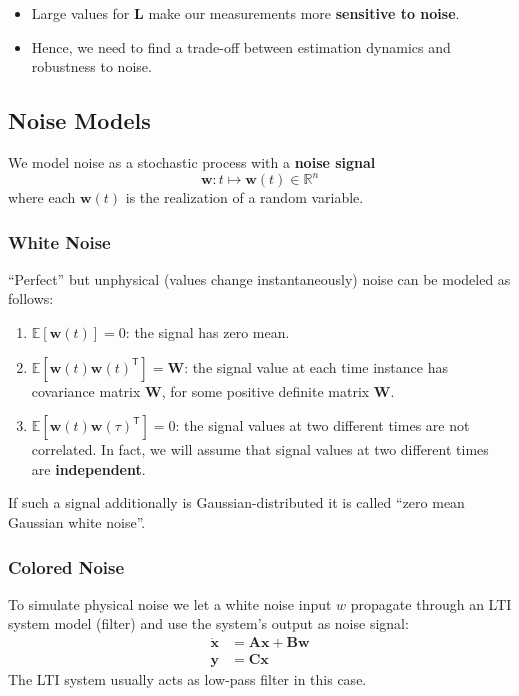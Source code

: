 \newpar{}


\begin{itemize}
    \item Large values for $\mathbf{L}$ make our measurements more \textbf{sensitive to noise}.
    \item Hence, we need to find a trade-off between estimation dynamics and robustness to noise.
\end{itemize}

\subsection{Noise Models}
We model noise as a stochastic process with a \textbf{noise signal}
\begin{equation*}
    \mathbf{w}:t\mapsto \mathbf{w}(t)\in\mathbb{R}^n
\end{equation*}
where each $\mathbf{w}(t)$ is the realization of a random variable.

\subsubsection{White Noise}
``Perfect'' but unphysical (values change instantaneously) noise can be modeled as follows:
\begin{enumerate}
    \item $\mathbb{E}[\mathbf{w}(t)]=0$:\newline
          the signal has zero mean.
    \item $\mathbb{E}[\mathbf{w}(t){\mathbf{w}(t)}^{\mathsf{T}}]=\mathbf{W}$:\newline
          the signal value at each time instance has covariance matrix $\mathbf{W}$, for some positive definite matrix $\mathbf{W}$.
    \item $\mathbb{E}[\mathbf{w}(t){\mathbf{w}(\tau)}^{\mathsf{T}}]=0$:\newline
          the signal values at two different times are not correlated. In fact, we will assume that signal values at two different times are \textbf{independent}.
\end{enumerate}
If such a signal additionally is Gaussian-distributed it is called ``zero mean Gaussian white noise''.

\subsubsection{Colored Noise}
To simulate physical noise we let a white noise input $w$ propagate through an LTI system model (filter) and use the system's output as noise signal:
\begin{align*}
    \dot{\mathbf{x}} & =\mathbf{Ax}+\mathbf{Bw} \\
    \mathbf{ y}      & = \mathbf{Cx}
\end{align*}
The LTI system usually acts as low-pass filter in this case.


